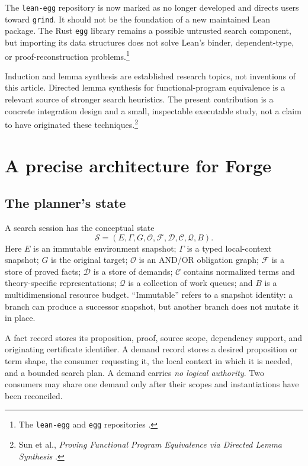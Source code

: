 \documentclass[11pt,a4paper]{article}
\newcommand{\code}[1]{\texttt{#1}}
\begin{document}
The \code{lean-egg} repository is now marked as no longer developed and directs
users toward \code{grind}. It should not be the foundation of a new maintained
Lean package. The Rust \code{egg} library remains a possible untrusted search
component, but importing its data structures does not solve Lean's binder,
dependent-type, or proof-reconstruction problems.\footnote{The \code{lean-egg}
and \code{egg} repositories \cite{leanegg,egg}.}

Induction and lemma synthesis are established research topics, not inventions
of this article. Directed lemma synthesis for functional-program equivalence
is a relevant source of stronger search heuristics. The present contribution
is a concrete integration design and a small, inspectable executable study,
not a claim to have originated these techniques.\footnote{Sun et al.,
\emph{Proving Functional Program Equivalence via Directed Lemma Synthesis}
\cite{lemmasynthesis}.}

\section{A precise architecture for Forge}
\label{sec:architecture}

\subsection{The planner's state}
A search session has the conceptual state
\[
 \mathcal S=(E,\Gamma,G,\mathcal O,\mathcal F,\mathcal D,\mathcal C,\mathcal Q,B).
\]
Here $E$ is an immutable environment snapshot; $\Gamma$ is a typed local-context
snapshot; $G$ is the original target; $\mathcal O$ is an AND/OR obligation graph;
$\mathcal F$ is a store of proved facts; $\mathcal D$ is a store of demands;
$\mathcal C$ contains normalized terms and theory-specific representations;
$\mathcal Q$ is a collection of work queues; and $B$ is a multidimensional
resource budget. ``Immutable'' refers to a snapshot identity: a branch can
produce a successor snapshot, but another branch does not mutate it in place.

A fact record stores its proposition, proof, source scope, dependency support,
and originating certificate identifier. A demand record stores a desired
proposition or term shape, the consumer requesting it, the local context in
which it is needed, and a bounded search plan. A demand carries \emph{no logical
authority}. Two consumers may share one demand only after their scopes and
instantiations have been reconciled.
\end{document}
